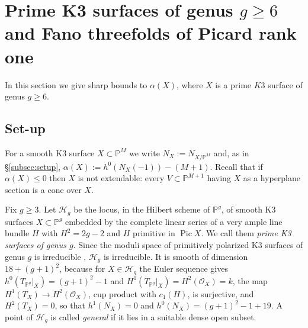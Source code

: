 \documentclass[11pt,twoside]{amsart}
\theoremstyle{plain}
\theoremstyle{definition}
\newtheorem{remark}[theorem]{Remark}
\newcommand{\PP}{\mathbb{P}}
\newcommand{\PM}{\mathbb{P}^M}
\newcommand{\OO}{\mathcal{O}}
\renewcommand{\Im}{\operatorname{Im}}
\newcommand{\Yt}{\widetilde{Y}}
\newcommand{\Ct}{\widetilde{C}}
\newcommand{\yt}{\tilde{y}}
\newcommand{\GH}{G_H}
\newcommand{\Dd}{D}
\begin{document}

\section{Prime K3 surfaces of genus $g \geq 6$ and Fano threefolds of Picard rank one}\label{sec:fano}

In this section we give sharp bounds to $\alpha(X)$, where $X$ is a prime $K3$ surface of genus $g \geq 6$.

\subsection{Set-up}\label{subsec:fano-setup}

For a smooth K3 surface $X\subset\PP^M$ we write $N_X:=N_{X/\PP^M}$ and, as in \S\ref{subsec:setup}, $\alpha(X):=h^0(N_X(-1))-(M+1)$. Recall \cite{Zak91,Lvo92} that if $\alpha(X)\le0$ then $X$ is not extendable: every $V\subset\PP^{M+1}$ having $X$ as a hyperplane section is a cone over $X$.

Fix $g\ge3$. Let $\mathcal H_g$ be the locus, in the Hilbert scheme of $\PP^g$, of smooth K3 surfaces $X\subset\PP^g$ embedded by the complete linear series of a very ample line bundle $H$ with $H^2=2g-2$ and $H$ primitive in $\operatorname{Pic}X$. We call them \emph{prime K3 surfaces of genus $g$}. Since the moduli space of primitively polarized K3 surfaces of genus $g$ is irreducible \cite[Ch.~6]{Huy16}, $\mathcal H_g$ is irreducible. It is smooth of dimension $18+(g+1)^2$, because for $X\in\mathcal H_g$ the Euler sequence gives $h^0(T_{\PP^g}|_X)=(g+1)^2-1$ and $H^1(T_{\PP^g}|_X)=H^2(\OO_X)=k$, the map $H^1(T_X)\to H^2(\OO_X)$, cup product with $c_1(H)$, is surjective, and $H^2(T_X)=0$, so that $h^1(N_X)=0$ and $h^0(N_X)=(g+1)^2-1+19$. A point of $\mathcal H_g$ is called \emph{general} if it lies in a suitable dense open subset.
\end{document}
